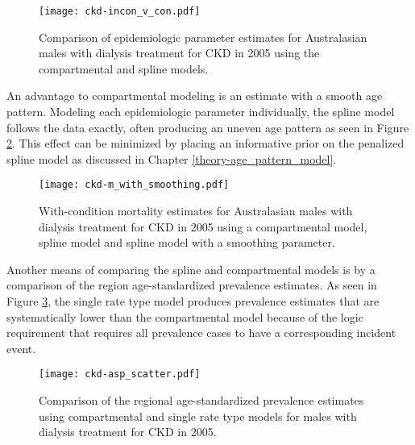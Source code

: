     \begin{figure}[h]
        \begin{center}
            \texttt{[image: ckd-incon\_v\_con.pdf]}
            \caption{Comparison of epidemiologic parameter estimates
              for Australasian males with dialysis treatment for CKD
              in 2005 using the compartmental and spline
              models.}
            \label{fig:app-CKD incon v con}
        \end{center}
    \end{figure}

An advantage to compartmental modeling is an estimate with a smooth
age pattern. Modeling each epidemiologic parameter individually, the
spline model follows the data exactly, often producing an
uneven age pattern as seen in Figure \ref{fig:app-CKD smooth}.  This
effect can be minimized by placing an informative prior on the
penalized spline model as discussed in Chapter
\ref{theory-age_pattern_model}.

    \begin{figure}[h]
        \begin{center}
            \texttt{[image: ckd-m\_with\_smoothing.pdf]}
            \caption{With-condition mortality estimates for
              Australasian males with dialysis treatment for CKD in
              2005 using a compartmental model, spline model
              and spline model with a smoothing parameter.}
            \label{fig:app-CKD smooth}
        \end{center}
    \end{figure}

Another means of comparing the spline and compartmental
models is by a comparison of the region age-standardized prevalence
estimates.  As seen in Figure \ref{fig:app-CKD asp}, the single rate
type model produces prevalence estimates that are systematically lower
than the compartmental model because of the logic requirement that
requires all prevalence cases to have a corresponding incident event.

    \begin{figure}[h]
        \begin{center}
            \texttt{[image: ckd-asp\_scatter.pdf]}
            \caption{Comparison of the regional age-standardized
              prevalence estimates using compartmental and single rate
              type models for males with dialysis treatment for CKD in
              2005.}
            \label{fig:app-CKD asp}
        \end{center}
    \end{figure}
